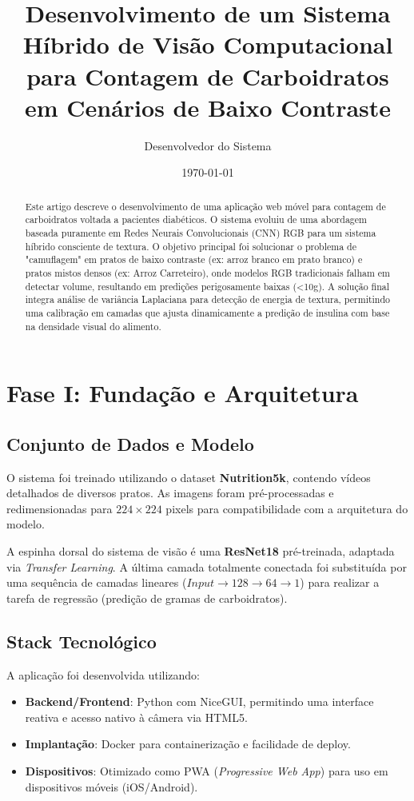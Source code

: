 \documentclass[a4paper,12pt]{article}
\title{Desenvolvimento de um Sistema Híbrido de Visão Computacional para Contagem de Carboidratos em Cenários de Baixo Contraste}
\author{Desenvolvedor do Sistema}
\date{\today}
\begin{document}
\maketitle

\begin{abstract}
Este artigo descreve o desenvolvimento de uma aplicação web móvel para contagem de carboidratos voltada a pacientes diabéticos. O sistema evoluiu de uma abordagem baseada puramente em Redes Neurais Convolucionais (CNN) RGB para um sistema híbrido consciente de textura. O objetivo principal foi solucionar o problema de "camuflagem" em pratos de baixo contraste (ex: arroz branco em prato branco) e pratos mistos densos (ex: Arroz Carreteiro), onde modelos RGB tradicionais falham em detectar volume, resultando em predições perigosamente baixas (<10g). A solução final integra análise de variância Laplaciana para detecção de energia de textura, permitindo uma calibração em camadas que ajusta dinamicamente a predição de insulina com base na densidade visual do alimento.
\end{abstract}

\section{Fase I: Fundação e Arquitetura}

\subsection{Conjunto de Dados e Modelo}
O sistema foi treinado utilizando o dataset \textbf{Nutrition5k}, contendo vídeos detalhados de diversos pratos. As imagens foram pré-processadas e redimensionadas para $224 \times 224$ pixels para compatibilidade com a arquitetura do modelo. 

A espinha dorsal do sistema de visão é uma \textbf{ResNet18} pré-treinada, adaptada via \textit{Transfer Learning}. A última camada totalmente conectada foi substituída por uma sequência de camadas lineares ($Input \rightarrow 128 \rightarrow 64 \rightarrow 1$) para realizar a tarefa de regressão (predição de gramas de carboidratos).

\subsection{Stack Tecnológico}
A aplicação foi desenvolvida utilizando:
\begin{itemize}
    \item \textbf{Backend/Frontend}: Python com NiceGUI, permitindo uma interface reativa e acesso nativo à câmera via HTML5.
    \item \textbf{Implantação}: Docker para containerização e facilidade de deploy.
    \item \textbf{Dispositivos}: Otimizado como PWA (\textit{Progressive Web App}) para uso em dispositivos móveis (iOS/Android).
\end{itemize}
\end{document}
